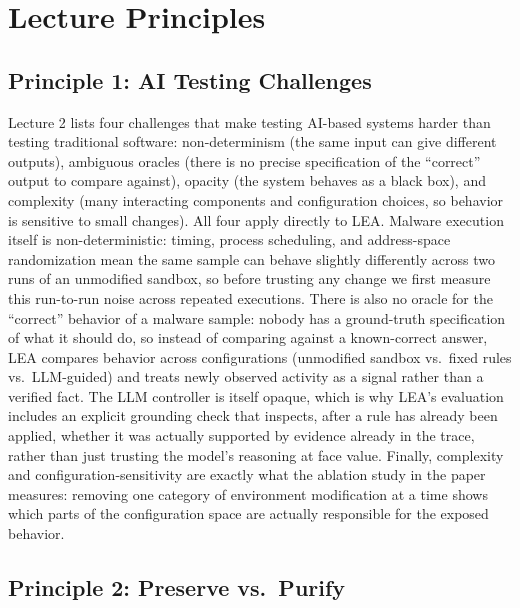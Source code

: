 \documentclass[11pt,a4paper]{article}
\begin{document}
\section{Lecture Principles}

\subsection{Principle 1: AI Testing Challenges}

Lecture 2 lists four challenges that make testing AI-based systems harder than testing traditional software: non-determinism (the same input can give different outputs), ambiguous oracles (there is no precise specification of the ``correct'' output to compare against), opacity (the system behaves as a black box), and complexity (many interacting components and configuration choices, so behavior is sensitive to small changes).
All four apply directly to LEA.
Malware execution itself is non-deterministic: timing, process scheduling, and address-space randomization mean the same sample can behave slightly differently across two runs of an unmodified sandbox, so before trusting any change we first measure this run-to-run noise across repeated executions.
There is also no oracle for the ``correct'' behavior of a malware sample: nobody has a ground-truth specification of what it should do, so instead of comparing against a known-correct answer, LEA compares behavior across configurations (unmodified sandbox vs.\ fixed rules vs.\ LLM-guided) and treats newly observed activity as a signal rather than a verified fact.
The LLM controller is itself opaque, which is why LEA's evaluation includes an explicit grounding check that inspects, after a rule has already been applied, whether it was actually supported by evidence already in the trace, rather than just trusting the model's reasoning at face value.
Finally, complexity and configuration-sensitivity are exactly what the ablation study in the paper measures: removing one category of environment modification at a time shows which parts of the configuration space are actually responsible for the exposed behavior.

\subsection{Principle 2: Preserve vs.\ Purify}
\end{document}
